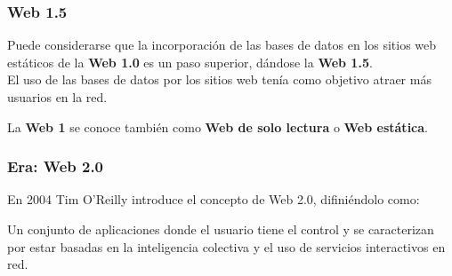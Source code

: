 \documentclass[
10pt, %
aspectratio=169, %
]{beamer}
\begin{document}
	\begin{frame}
		
		\frametitle{Web 1.5}
		
		Puede considerarse que la incorporación de las bases de datos en los sitios web estáticos de la \textbf{Web 1.0} es un paso superior, dándose la \textbf{Web 1.5}.\\[2mm]
		
		El uso de las bases de datos por los sitios web tenía como objetivo atraer más usuarios en la red. 
		
		\pause
		\vspace{3\baselineskip}
		
		La \textbf{Web 1} se conoce también como \textbf{Web de solo lectura} o \textbf{Web estática}.
		
	\end{frame}
	
	\begin{frame}
		
		\frametitle{Era: Web 2.0}
		
		En 2004 Tim O'Reilly introduce el concepto de Web 2.0, difiniéndolo como:
		
		\begin{alertblock}{}
			Un conjunto de aplicaciones donde el usuario tiene el control y se caracterizan por estar basadas en la inteligencia colectiva y el uso de servicios interactivos en red.
		\end{alertblock}
		

		
	\end{frame}
	
\end{document}
